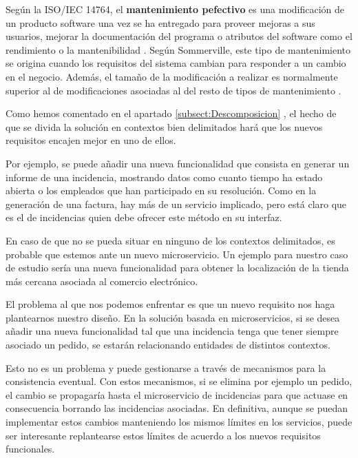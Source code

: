 \documentclass[11pt,spanish,listoffigures]{tfgetsinf}
\begin{document}

Según la ISO/IEC 14764, el \textbf{mantenimiento pefectivo} es una modificación de un producto software una vez se ha entregado para proveer mejoras a sus usuarios, mejorar la documentación del programa o atributos del software como el rendimiento o la mantenibilidad \cite{Bourque2014}. Según Sommerville, este tipo de mantenimiento se origina cuando los requisitos del sistema cambian para responder a un cambio en el negocio. Además, el tamaño de la modificación a realizar es normalmente superior al de modificaciones asociadas al del resto de tipos de mantenimiento \cite{Sommerville2010}.

Como hemos comentado en el apartado \ref{subsect:Descomposicion} , el hecho de que se divida la solución en contextos bien delimitados hará que los nuevos requisitos encajen mejor en uno de ellos.

Por ejemplo, se puede añadir una nueva funcionalidad que consista en generar un informe de una incidencia, mostrando datos como cuanto tiempo ha estado abierta o los empleados que han participado en su resolución. Como en la generación de una factura, hay más de un servicio implicado, pero está claro que es el de incidencias quien debe ofrecer este método en su interfaz.

En caso de que no se pueda situar en ninguno de los contextos delimitados, es probable que estemos ante un nuevo microservicio. Un ejemplo para nuestro caso de estudio sería una nueva funcionalidad para obtener la localización de la tienda más cercana asociada al comercio electrónico.

El problema al que nos podemos enfrentar es que un nuevo requisito nos haga plantearnos nuestro diseño. En la solución basada en microservicios, si se desea añadir una nueva funcionalidad tal que una incidencia tenga que tener siempre asociado un pedido, se estarán relacionando entidades de distintos contextos. 

Esto no es un problema y puede gestionarse a través de mecanismos para la consistencia eventual. Con estos mecanismos, si se elimina por ejemplo un pedido, el cambio se propagaría hasta el microservicio de incidencias para que actuase en consecuencia borrando las incidencias asociadas. En definitiva, aunque se puedan implementar estos cambios manteniendo los mismos límites en los servicios, puede ser interesante replantearse estos límites de acuerdo a los nuevos requisitos funcionales.
\end{document}
